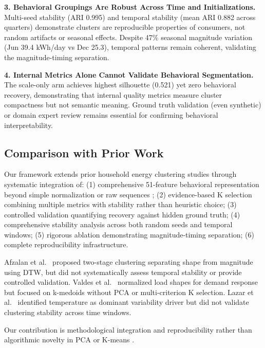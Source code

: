\documentclass[11pt,a4paper]{article}
\begin{document}
\textbf{3. Behavioral Groupings Are Robust Across Time and Initializations.} Multi-seed stability (ARI 0.995) and temporal stability (mean ARI 0.882 across quarters) demonstrate clusters are reproducible properties of consumers, not random artifacts or seasonal effects. Despite 47\% seasonal magnitude variation (Jun 39.4 kWh/day vs Dec 25.3), temporal patterns remain coherent, validating the magnitude-timing separation.

\textbf{4. Internal Metrics Alone Cannot Validate Behavioral Segmentation.} The scale-only arm achieves highest silhouette (0.521) yet zero behavioral recovery, demonstrating that internal quality metrics measure cluster compactness but not semantic meaning. Ground truth validation (even synthetic) or domain expert review remains essential for confirming behavioral interpretability.

\subsection{Comparison with Prior Work}

Our framework extends prior household energy clustering studies \cite{kwac2014household,rhodes2014clustering,jin2016loadshape,lazar2021investigating} through systematic integration of: (1) comprehensive 51-feature behavioral representation beyond simple normalization \cite{valdes2021smart} or raw sequences \cite{kwac2014household}; (2) evidence-based K selection combining multiple metrics with stability rather than heuristic choice; (3) controlled validation quantifying recovery against hidden ground truth; (4) comprehensive stability analysis across both random seeds and temporal windows; (5) rigorous ablation demonstrating magnitude-timing separation; (6) complete reproducibility infrastructure.

Afzalan et al.~\cite{afzalan2020twostage} proposed two-stage clustering separating shape from magnitude using DTW, but did not systematically assess temporal stability or provide controlled validation. Valdes et al.~\cite{valdes2021smart} normalized load shapes for demand response but focused on k-medoids without PCA or multi-criterion K selection. Lazar et al.~\cite{lazar2021investigating} identified temperature as dominant variability driver but did not validate clustering stability across time windows.

Our contribution is methodological integration and reproducibility rather than algorithmic novelty in PCA \cite{jolliffe2002pca} or K-means \cite{lloyd1982least,arthur2007kmeans}.
\end{document}
